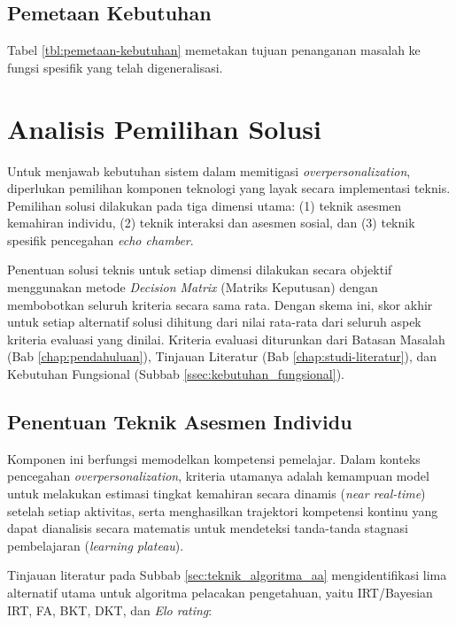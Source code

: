 \subsection{Pemetaan Kebutuhan}
\label{ssec:pemetaan_kebutuhan}
Tabel \ref{tbl:pemetaan-kebutuhan} memetakan tujuan penanganan masalah ke fungsi spesifik yang telah digeneralisasi.



\section{Analisis Pemilihan Solusi}
\label{sec:analisis_pemilihan_solusi}
Untuk menjawab kebutuhan sistem dalam memitigasi \textit{overpersonalization}, diperlukan pemilihan komponen teknologi yang layak secara implementasi teknis. Pemilihan solusi dilakukan pada tiga dimensi utama: (1) teknik asesmen kemahiran individu, (2) teknik interaksi dan asesmen sosial, dan (3) teknik spesifik pencegahan \textit{echo chamber}.

Penentuan solusi teknis untuk setiap dimensi dilakukan secara objektif menggunakan metode \textit{Decision Matrix} (Matriks Keputusan) dengan membobotkan seluruh kriteria secara sama rata. Dengan skema ini, skor akhir untuk setiap alternatif solusi dihitung dari nilai rata-rata dari seluruh aspek kriteria evaluasi yang dinilai. Kriteria evaluasi diturunkan dari Batasan Masalah (Bab \ref{chap:pendahuluan}), Tinjauan Literatur (Bab \ref{chap:studi-literatur}), dan Kebutuhan Fungsional (Subbab \ref{ssec:kebutuhan_fungsional}).

\subsection{Penentuan Teknik Asesmen Individu}
\label{ssec:keputusan_asesmen_individu}
Komponen ini berfungsi memodelkan kompetensi pemelajar. Dalam konteks pencegahan \textit{overpersonalization}, kriteria utamanya adalah kemampuan model untuk melakukan estimasi tingkat kemahiran secara dinamis (\textit{near real-time}) setelah setiap aktivitas, serta menghasilkan trajektori kompetensi kontinu yang dapat dianalisis secara matematis untuk mendeteksi tanda-tanda stagnasi pembelajaran (\textit{learning plateau}).

Tinjauan literatur pada Subbab \ref{sec:teknik_algoritma_aa} mengidentifikasi lima alternatif utama untuk algoritma pelacakan pengetahuan, yaitu IRT/Bayesian IRT, FA, BKT, DKT, dan \textit{Elo rating}:

